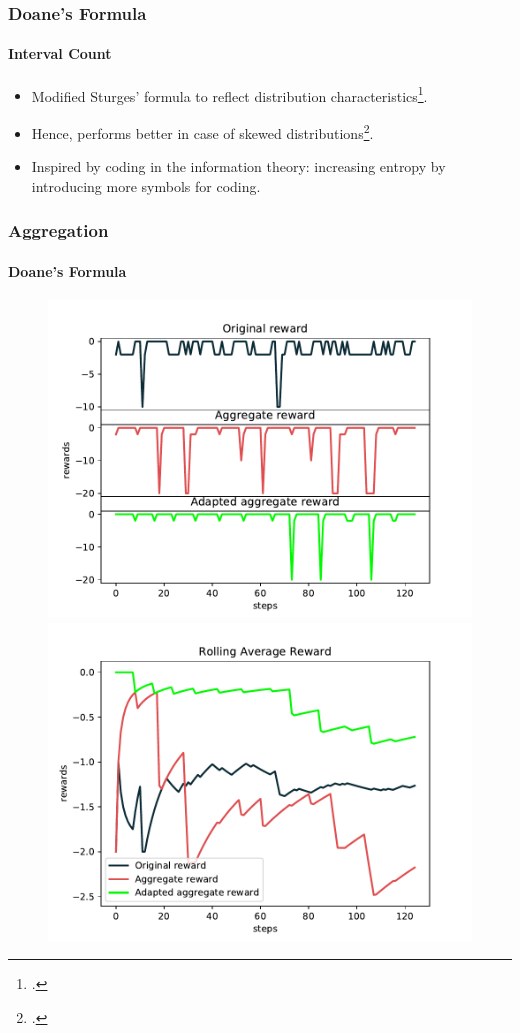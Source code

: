 \documentclass[mathserif]{beamer}
\begin{document}
    \begin{frame}
        \frametitle{Doane's Formula}
        \framesubtitle{Interval Count}

        \begin{itemize}
            \item Modified Sturges' formula to reflect distribution characteristics\footcite{Doane1976}.
            \item Hence, performs better in case of skewed distributions\footcite{Doane2011}.
            \item Inspired by coding in the information theory: increasing entropy by introducing more symbols for
            coding.
        \end{itemize}

    \end{frame}


    \begin{frame}
        \frametitle{Aggregation}
        \framesubtitle{Doane's Formula}

        \begin{figure}
            \label{fig:doane-rewards}
            \centering
            \includegraphics[width=0.46\columnwidth]{res/experiments/doane_steps_rewards.pdf}
            \qquad
            \includegraphics[width=0.46\columnwidth]{res/experiments/doane_rolling_rewards.pdf}
        \end{figure}

    \end{frame}
\end{document}
